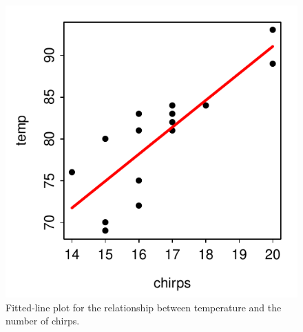 \documentclass[10pt,openany]{book}\usepackage[]{graphicx}\usepackage[]{color}
\newenvironment{knitrout}{}{} %
\begin{document}
\begin{itemize}
\begin{enumerate}
\begin{knitrout}
\begin{figure}[hbtp]
{\centering \includegraphics[width=.4\linewidth]{Figs/ChirpsFitPlot-1} 

}

\caption[Fitted-line plot for the relationship between temperature and the number of chirps]{Fitted-line plot for the relationship between temperature and the number of chirps.}\label{fig:ChirpsFitPlot}
\end{figure}


\end{knitrout}
    \end{enumerate}

\end{itemize}





\end{document}
